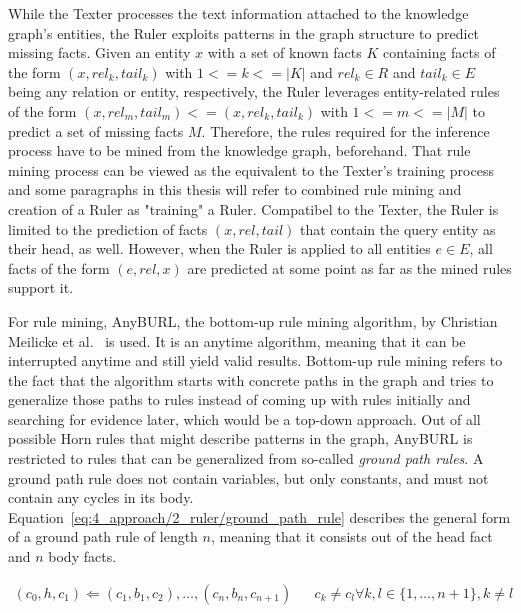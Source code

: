 While the Texter processes the text information attached to the knowledge graph's entities, the Ruler exploits patterns in the graph structure to predict missing facts. Given an entity $x$ with a set of known facts $K$ containing facts of the form $(x, rel_k, tail_k)$ with $1 <= k <= |K|$ and $rel_k \in R$ and $tail_k \in E$ being any relation or entity, respectively, the Ruler leverages entity-related rules of the form $(x, rel_m, tail_m) <= (x, rel_k, tail_k)$ with $1 <= m <= |M|$ to predict a set of missing facts $M$. Therefore, the rules required for the inference process have to be mined from the knowledge graph, beforehand. That rule mining process can be viewed as the equivalent to the Texter's training process and some paragraphs in this thesis will refer to combined rule mining and creation of a Ruler as "training" a Ruler. Compatibel to the Texter, the Ruler is limited to the prediction of facts $(x, rel, tail)$ that contain the query entity as their head, as well. However, when the Ruler is applied to all entities $e \in E$, all facts of the form $(e, rel, x)$ are predicted at some point as far as the mined rules support it.

For rule mining, AnyBURL, the bottom-up rule mining algorithm, by Christian Meilicke et al.~\cite{Meilicke2019AnytimeBR} is used. It is an anytime algorithm, meaning that it can be interrupted anytime and still yield valid results. Bottom-up rule mining refers to the fact that the algorithm starts with concrete paths in the graph and tries to generalize those paths to rules instead of coming up with rules initially and searching for evidence later, which would be a top-down approach. Out of all possible Horn rules that might describe patterns in the graph, AnyBURL is restricted to rules that can be generalized from so-called \emph{ground path rules}. A ground path rule does not contain variables, but only constants, and must not contain any cycles in its body. Equation~\ref{eq:4_approach/2_ruler/ground_path_rule} describes the general form of a ground path rule of length $n$, meaning that it consists out of the head fact and $n$ body facts.

\begin{align}
(c_0, h, c_1)
    \Leftarrow (c_1, b_1, c_2), \dots, (c_n, b_n, c_{n+1}) &&
    c_k \neq c_l \forall k, l \in \{1, \dots, n+1\}, k \ne l
    \label{eq:4_approach/2_ruler/ground_path_rule}
\end{align}

